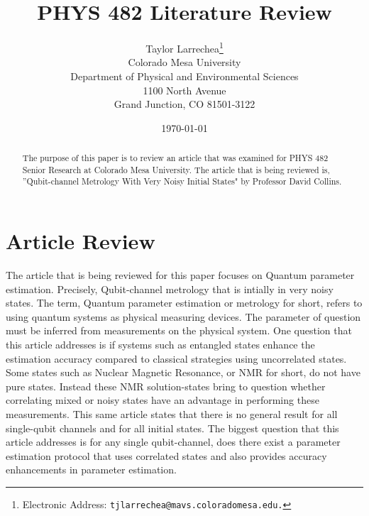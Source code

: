 \documentclass[twocolumn]{article}
\begin{document}
\title{\textbf{PHYS 482 Literature Review}}
\author{Taylor Larrechea\footnote{Electronic Address: \texttt{tjlarrechea@mavs.coloradomesa.edu.}} \\
    Colorado Mesa University \\
    Department of Physical and Environmental Sciences \\
    1100 North Avenue \\
    Grand Junction, CO 81501-3122}
\date{\today}
\maketitle
\begin{abstract}
The purpose of this paper is to review an article that was examined for PHYS 482 Senior Research at Colorado Mesa University. The article that is being reviewed is, ''Qubit-channel Metrology With Very Noisy Initial States" by Professor David Collins.
\end{abstract}
\section*{Article Review}
The article that is being reviewed for this paper focuses on Quantum parameter estimation. Precisely, Qubit-channel metrology that is intially in very noisy states. The term, Quantum parameter estimation or metrology for short, refers to using quantum systems as physical measuring devices. The parameter of question must be inferred from measurements on the physical system. One question that this article addresses is if systems such as entangled states enhance the estimation accuracy compared to classical strategies using uncorrelated states. Some states such as Nuclear Magnetic Resonance, or NMR for short, do not have pure states. Instead these NMR solution-states bring to question whether correlating mixed or noisy states have an advantage in performing these measurements. This same article states that there is no general result for all single-qubit channels and for all initial states. The biggest question that this article addresses is for any single qubit-channel, does there exist a parameter estimation protocol that uses correlated states and also provides accuracy enhancements in parameter estimation.
\end{document}
